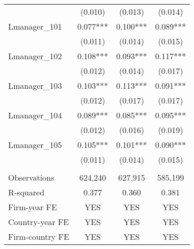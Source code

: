 \begin{tabular}{lccc}
 & (0.010) & (0.013) & (0.014) \\
Lmanager\_101 & 0.077*** & 0.100*** & 0.089*** \\
 & (0.011) & (0.014) & (0.015) \\
Lmanager\_102 & 0.108*** & 0.093*** & 0.117*** \\
 & (0.012) & (0.014) & (0.017) \\
Lmanager\_103 & 0.103*** & 0.113*** & 0.091*** \\
 & (0.012) & (0.017) & (0.017) \\
Lmanager\_104 & 0.089*** & 0.085*** & 0.095*** \\
 & (0.012) & (0.016) & (0.019) \\
Lmanager\_105 & 0.105*** & 0.101*** & 0.090*** \\
 & (0.011) & (0.014) & (0.015) \\
 &  &  &  \\
Observations & 624,240 & 627,915 & 585,199 \\
R-squared & 0.377 & 0.360 & 0.381 \\
Firm-year FE & YES & YES & YES \\
Country-year FE & YES & YES & YES \\
 Firm-country FE & YES & YES & YES \\ \hline
\end{tabular}
